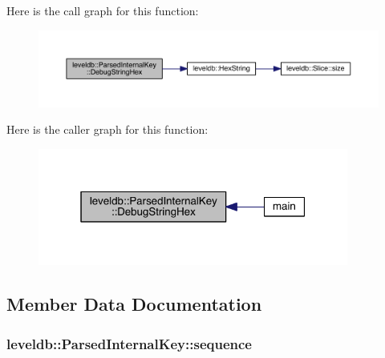 Here is the call graph for this function\+:\nopagebreak
\begin{figure}[H]
\begin{center}
\leavevmode
\includegraphics[width=350pt]{structleveldb_1_1_parsed_internal_key_abe071a64c182073e4531cd78fd5a7078_cgraph}
\end{center}
\end{figure}




Here is the caller graph for this function\+:\nopagebreak
\begin{figure}[H]
\begin{center}
\leavevmode
\includegraphics[width=289pt]{structleveldb_1_1_parsed_internal_key_abe071a64c182073e4531cd78fd5a7078_icgraph}
\end{center}
\end{figure}




\subsection{Member Data Documentation}
\hypertarget{structleveldb_1_1_parsed_internal_key_a3ab7f4382bc026081875fde4dea95e61}{}
\subsubsection[{sequence}]{ leveldb\+::\+Parsed\+Internal\+Key\+::sequence}\label{structleveldb_1_1_parsed_internal_key_a3ab7f4382bc026081875fde4dea95e61}
\hypertarget{structleveldb_1_1_parsed_internal_key_ac7c10a6f60f93982b886ad1fbbafd6c2}{}
